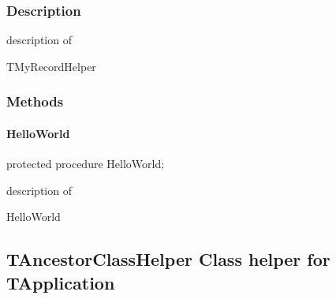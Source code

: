 \documentclass{report}
\newif\ifpdf
\begin{document}
\subsubsection*{\large{\textbf{Description}}\normalsize\hspace{1ex}\hfill}
description of \begin{ttfamily}TMyRecordHelper\end{ttfamily}\subsubsection*{\large{\textbf{Methods}}\normalsize\hspace{1ex}\hfill}
\paragraph*{HelloWorld}\hspace*{\fill}

\label{ok_class_record_helpers.TMyRecordHelper-HelloWorld}
\begin{list}{}{
\setlength{\itemindent}{0cm}
\setlength{\listparindent}{0cm}
\setlength{\leftmargin}{\evensidemargin}
\addtolength{\leftmargin}{\tmplength}
\settowidth{\labelsep}{X}
\addtolength{\leftmargin}{\labelsep}
\setlength{\labelwidth}{\tmplength}
}
\item[\textbf{Declaration}\hfill]
\ifpdf
\begin{flushleft}
\fi
\begin{ttfamily}
protected procedure HelloWorld;\end{ttfamily}

\ifpdf
\end{flushleft}
\fi

\par
\item[\textbf{Description}]
description of \begin{ttfamily}HelloWorld\end{ttfamily}

\end{list}
\ifpdf
\subsection*{\large{\textbf{TAncestorClassHelper Class helper for TApplication}}\normalsize\hspace{1ex}\hrulefill}
\else
\subsection*{TAncestorClassHelper Class helper for TApplication}
\fi
\label{ok_class_record_helpers.TAncestorClassHelper}
\end{document}
